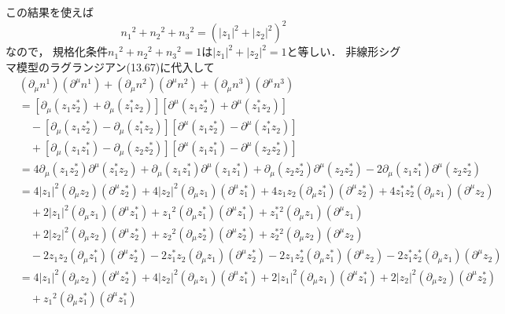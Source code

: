 この結果を使えば
\[ n_1{}^2 + n_2{}^2 + n_3{}^2 = (\lvert z_1 \rvert^2 + \lvert z_2 \rvert^2)^2 \]
なので，
規格化条件$n_1{}^2 + n_2{}^2 + n_3{}^2 = 1$は$\lvert z_1 \rvert^2 + \lvert z_2 \rvert^2 = 1$と等しい．
非線形シグマ模型のラグランジアン(13.67)に代入して
\begin{align*}
  & (\partial_\mu n^1) (\partial^\mu n^1) + (\partial_\mu n^2) (\partial^\mu n^2) + (\partial_\mu n^3) (\partial^\mu n^3) \\
  &= [ \partial_\mu(z_1 z_2^*) + \partial_\mu(z_1^* z_2) ] [ \partial^\mu(z_1 z_2^*) + \partial^\mu(z_1^* z_2) ] \\
  & \quad - [ \partial_\mu(z_1 z_2^*) - \partial_\mu(z_1^* z_2) ] [ \partial^\mu(z_1 z_2^*) - \partial^\mu(z_1^* z_2) ] \\
  & \quad + [ \partial_\mu(z_1 z_1^*) - \partial_\mu(z_2 z_2^*) ] [ \partial^\mu(z_1 z_1^*) - \partial^\mu(z_2 z_2^*) ] \\
  &= 4 \partial_\mu(z_1 z_2^*) \partial^\mu(z_1^* z_2)
  + \partial_\mu(z_1 z_1^*) \partial^\mu(z_1 z_1^*)
  + \partial_\mu(z_2 z_2^*) \partial^\mu(z_2 z_2^*)
  - 2\partial_\mu(z_1 z_1^*) \partial^\mu(z_2 z_2^*) \\
  &= 4 \lvert z_1 \rvert^2 (\partial_\mu z_2) (\partial^\mu z_2^*)
  + 4 \lvert z_2 \rvert^2 (\partial_\mu z_1) (\partial^\mu z_1^*)
  + 4 z_1 z_2 (\partial_\mu z_1^*) (\partial^\mu z_2^*)
  + 4 z_1^* z_2^* (\partial_\mu z_1) (\partial^\mu z_2) \\
  & \quad + 2 \lvert z_1 \rvert^2 (\partial_\mu z_1) (\partial^\mu z_1^*)
  + z_1{}^2 (\partial_\mu z_1^*) (\partial^\mu z_1^*)
  + z_1^*{}^2 (\partial_\mu z_1) (\partial^\mu z_1) \\
  & \quad + 2 \lvert z_2 \rvert^2 (\partial_\mu z_2) (\partial^\mu z_2^*)
  + z_2{}^2 (\partial_\mu z_2^*) (\partial^\mu z_2^*)
  + z_2^*{}^2 (\partial_\mu z_2) (\partial^\mu z_2) \\
  & \quad -2 z_1 z_2 (\partial_\mu z_1^*) (\partial^\mu z_2^*)
  -2 z_1^* z_2 (\partial_\mu z_1) (\partial^\mu z_2^*)
  -2 z_1 z_2^* (\partial_\mu z_1^*) (\partial^\mu z_2)
  -2 z_1^* z_2^* (\partial_\mu z_1) (\partial^\mu z_2) \\
  &= 4 \lvert z_1 \rvert^2 (\partial_\mu z_2) (\partial^\mu z_2^*)
  + 4 \lvert z_2 \rvert^2 (\partial_\mu z_1) (\partial^\mu z_1^*)
  + 2 \lvert z_1 \rvert^2 (\partial_\mu z_1) (\partial^\mu z_1^*)
  + 2 \lvert z_2 \rvert^2 (\partial_\mu z_2) (\partial^\mu z_2^*) \\
  & \quad + z_1{}^2 (\partial_\mu z_1^*) (\partial^\mu z_1^*)

\end{align*}

